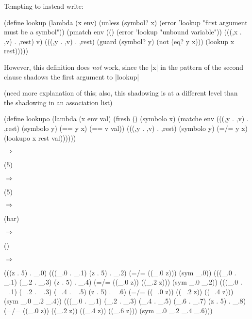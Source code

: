 Tempting to instead write:

\begin{schemedisplay}
(define lookup
  (lambda (x env)
    (unless (symbol? x)
      (error 'lookup "first argument must be a symbol"))
    (pmatch env
      (() (error 'lookup "unbound variable"))
      (((,x . ,v) . ,rest)
       v)
      (((,y . ,v) . ,rest) (guard (symbol? y) (not (eq? y x)))
       (lookup x rest)))))
\end{schemedisplay}

However, this definition does \emph{not} work, since the \scheme|x| in
the pattern of the second clause shadows the first argument to
\scheme|lookup|

(need more explanation of this; also, this shadowing is at a different
level than the shadowing in an association list)




\begin{schemedisplay}
(define lookupo
  (lambda (x env val)
    (fresh ()
      (symbolo x)
      (matche env
        (((,y . ,v) . ,rest) (symbolo y)
         (== y x) (== v val))
        (((,y . ,v) . ,rest) (symbolo y)
         (=/= y x) (lookupo x rest val))))))
\end{schemedisplay}

\noindent{} $\Rightarrow$
\begin{schemeresponsebox}(5)\end{schemeresponsebox}

\noindent{} $\Rightarrow$
\begin{schemeresponsebox}(5)\end{schemeresponsebox}

\noindent{} $\Rightarrow$
\begin{schemeresponsebox}(bar)\end{schemeresponsebox}

\noindent{} $\Rightarrow$
\begin{schemeresponsebox}()\end{schemeresponsebox}

\noindent{}

$\Rightarrow$

\begin{schemeresponsebox}
(((z . 5) . _.0)
 (((_.0 . _.1) (z . 5) . _.2)
  (=/= ((_.0 z))) (sym _.0))
 (((_.0 . _.1) (_.2 . _.3) (z . 5) . _.4)
  (=/= ((_.0 z)) ((_.2 z))) (sym _.0 _.2))
 (((_.0 . _.1) (_.2 . _.3) (_.4 . _.5) (z . 5) . _.6)
  (=/= ((_.0 z)) ((_.2 z)) ((_.4 z))) (sym _.0 _.2 _.4))
 (((_.0 . _.1) (_.2 . _.3) (_.4 . _.5) (_.6 . _.7) (z . 5) . _.8)
  (=/= ((_.0 z)) ((_.2 z)) ((_.4 z)) ((_.6 z))) (sym _.0 _.2 _.4 _.6)))
\end{schemeresponsebox}

